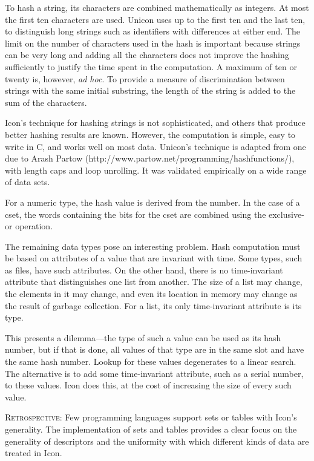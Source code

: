 To hash a string, its characters are combined mathematically as
integers. At most the first ten characters are used. {\color{blue}
Unicon uses up to the first ten and the last ten, to distinguish
long strings such as identifiers with differences at either end}.
The limit on the number of characters used in the hash is important
because strings can be very long and adding all the characters does
not improve the hashing sufficiently to justify the time spent in the
computation. A maximum of ten or twenty is, however, \textit{ad hoc}. To
provide a measure of discrimination between strings with the same
initial substring, the length of the string is added to the sum of the
characters.

Icon's technique for hashing strings is not sophisticated, and others
that produce better hashing results are known. However, the
computation is simple, easy to write in C, and works well on most data.
Unicon's technique is adapted from one due to Arash Partow
(http://www.partow.net/programming/hashfunctions/), with length
caps and loop unrolling.  It was validated empirically on a wide
range of data sets.

For a numeric type, the hash value is derived from the number. In the
case of a cset, the words containing the bits for the cset are
combined using the exclusive-or operation.

The remaining data types pose an interesting problem. Hash computation
must be based on attributes of a value that are invariant with
time. Some types, such as files, have such attributes. On the other
hand, there is no time-invariant attribute that distinguishes one list
from another. The size of a list may change, the elements in it may
change, and even its location in memory may change as the result of
garbage collection. For a list, its only time-invariant attribute is
its type.

This presents a dilemma{---}the type of such a value can be used as its
hash number, but if that is done, all values of that type are in the
same slot and have the same hash number. Lookup for these values
degenerates to a linear search.  The alternative is to add some
time-invariant attribute, such as a serial number, to these
values. Icon does this, at the cost of increasing the size of every
such value.

\textsc{Retrospective}: Few programming languages support sets or
tables with Icon's generality. The implementation of sets and tables
provides a clear focus on the generality of descriptors and the
uniformity with which different kinds of data are treated in Icon.

